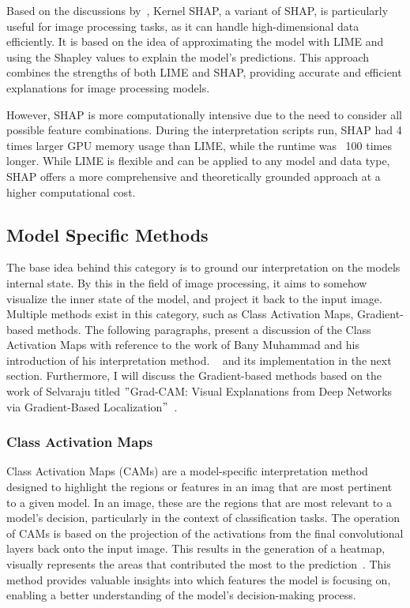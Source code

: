Based on the discussions by~\cite{lundberg2017unifiedapproachinterpretingmodel}, Kernel SHAP, a variant of SHAP,
is particularly useful for image processing tasks, as it can handle high-dimensional data efficiently.
It is based on the idea of approximating the model with LIME and using the Shapley values to explain
the model's predictions.
This approach combines the strengths of both LIME and SHAP, providing accurate and efficient explanations for
image processing models.

However, SHAP is more computationally intensive due to the need to consider all possible feature combinations.
During the interpretation scripts run, SHAP had 4 times larger GPU memory usage than LIME, while the runtime was ~100 times longer.
While LIME is flexible and can be applied to any model and data type, SHAP offers a more comprehensive and theoretically
grounded approach at a higher computational cost.

\subsection{Model Specific Methods}\label{subsec:model-specific-methods}
The base idea behind this category is to ground our interpretation on the models internal state.
By this in the field of image processing, it aims to somehow visualize the inner state of the model, and project it back to the input image.
Multiple methods exist in this category, such as Class Activation Maps, Gradient-based methods.
The following paragraphs, present a discussion of the Class Activation Maps with reference to the work of Bany Muhammad and his introduction of his interpretation method.
~\cite{Muhammad_2020} and its implementation in the next section.
Furthermore, I will discuss the Gradient-based methods based on the work of Selvaraju titled \("\)Grad-CAM: Visual
Explanations from Deep Networks via Gradient-Based Localization\("\)~\cite{Selvaraju_2019}.



\subsubsection{Class Activation Maps}\label{subsubsec:CAM}

Class Activation Maps (CAMs) are a model-specific interpretation method designed to highlight the regions or features
in an imag that are most pertinent to a given model.
In an image, these are the regions that are most relevant to a model's decision, particularly in the context of classification tasks.
The operation of CAMs is based on the projection of the activations from the final convolutional layers back onto the input image.
This results in the generation of a heatmap, visually represents the areas that contributed
the most to the prediction~\cite{Muhammad_2020}.
This method provides valuable insights into which features the model is focusing on, enabling a better understanding of
the model's decision-making process.

